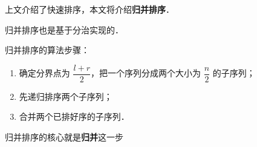 
上文介绍了快速排序，本文将介绍\textbf{归并排序}．

归并排序也是基于分治实现的．

归并排序的算法步骤：
\begin{enumerate}
\item 确定分界点为 $\dfrac{l + r}{2}$，把一个序列分成两个大小为 $\dfrac{n}{2}$ 的子序列；
\item 先递归排序两个子序列；
\item 合并两个已排好序的子序列．
\end{enumerate}

归并排序的核心就是\textbf{归并}这一步